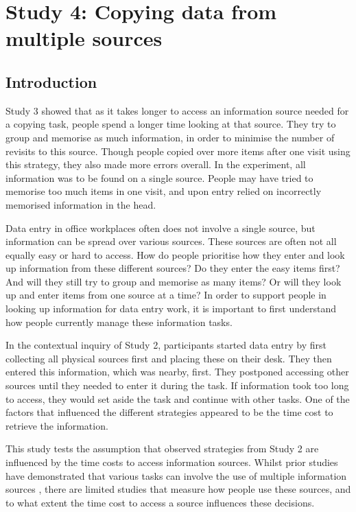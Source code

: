 \begin{table}
\section{Study 4: Copying data from multiple sources}
 
\subsection{Introduction}
Study 3 showed that as it takes longer to access an information source needed for a copying task, people spend a longer time looking at that source. They try to group and memorise as much information, in order to minimise the number of revisits to this source. Though people copied over more items after one visit using this strategy, they also made more errors overall. In the experiment, all information was to be found on a single source. People may have tried to memorise too much items in one visit, and upon entry relied on incorrectly memorised information in the head.

Data entry in office workplaces often does not involve a single source, but information can be spread over various sources. These sources are often not all equally easy or hard to access. How do people prioritise how they enter and look up information from these different sources? Do they enter the easy items first? And will they still try to group and memorise as many items? Or will they look up and enter items from one source at a time? In order to support people in looking up information for data entry work, it is important to first understand how people currently manage these information tasks.

In the contextual inquiry of Study 2, participants started data entry by first collecting all physical sources first and placing these on their desk. They then entered this information, which was nearby, first. They postponed accessing other sources until they needed to enter it during the task. If information took too long to access, they would set aside the task and continue with other tasks. One of the factors that influenced the different strategies appeared to be the time cost to retrieve the information. 

This study tests the assumption that observed strategies from Study 2 are influenced by the time costs to access information sources. Whilst prior studies have demonstrated that various tasks can involve the use of multiple information sources \citep{Cangiano2009, Murphy2016, Su2013}, there are limited studies that measure how people use these sources, and to what extent the time cost to access a source influences these decisions.


\end{table}
